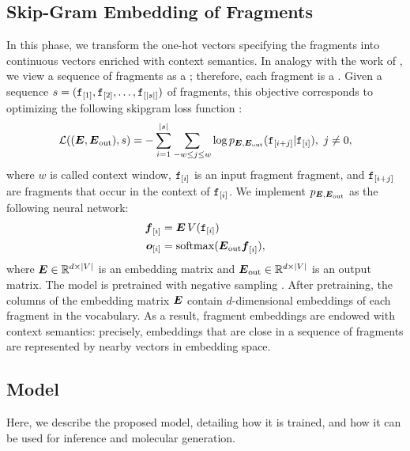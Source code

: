 \subsection{Skip-Gram Embedding of Fragments}
In this phase, we transform the one-hot vectors specifying the fragments into continuous vectors enriched with context semantics. In analogy with the work of \citet{bowman2016sentencescontinuousspace}, we view a sequence of fragments as a ; therefore, each fragment is a . Given a sequence $s = (\mathtt{f}_{[1]}, \mathtt{f}_{[2]}, \ldots, \mathtt{f}_{[|s|]})$ of fragments, this objective corresponds to optimizing the following skipgram loss function \citep{mikolov2014skipgram}:
$$\Loss((\Matrix{E}, \Matrix{E}_{\mathrm{out}}), s) = - \sum_{i=1}^{|s|}\sum_{-w \leq j \leq w} \log p_{\Matrix{E}, \Matrix{E}_{\mathrm{out}}}(\Graph{f}_{[i+j]}| \Graph{f}_{[i]}),\ j \neq 0,$$
where $w$ is called context window, $\mathtt{f}_{[i]}$ is an input fragment fragment, and $\mathtt{f}_{[i+j]}$ are fragments that occur in the context of $\mathtt{f}_{[i]}$. We implement $p_{\Matrix{E}, \Matrix{E}_{\mathrm{out}}}$ as the following neural network:
\begin{align*}
    \Elem{f}{i} &= \Matrix{E}\, V(\Graph{f}_{[i]})\\
    \Elem{o}{i} &= \softmax(\Matrix{E}_{\mathrm{out}}\Elem{f}{i}),
\end{align*}
where $\Matrix{E} \in \Real^{d \times |V|}$ is an embedding matrix and $\Matrix{E}_{\mathrm{out}} \in \Real^{d \times |V|}$ is an output matrix. The model is pretrained with negative sampling \citep{mikolov2014skipgram}. After pretraining, the columns of the embedding matrix $\Matrix{E}$ contain $d$-dimensional embeddings of each fragment in the vocabulary. As a result, fragment embeddings are endowed with context semantics: precisely, embeddings that are close in a sequence of fragments are represented by nearby vectors in embedding space.

\subsection{Model}
Here, we describe the proposed model, detailing how it is trained, and how it can be used for inference and molecular generation.

